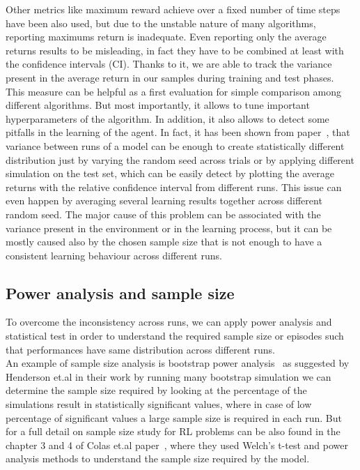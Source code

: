 \documentclass{article}
\begin{document}
Other metrics like maximum reward achieve over a fixed number of time steps have been also used, but  due to the unstable nature of many algorithms, reporting maximums return is inadequate. Even reporting only the average returns results to be misleading, in fact they have to be combined at least with the confidence intervals (CI). Thanks to it, we are able to track the variance present in the average return in our samples during training and test phases.\\ This measure can be helpful as a first evaluation for simple comparison among different algorithms. But most importantly, it allows to tune important hyperparameters of the algorithm. In addition, it also allows to detect some pitfalls in the learning of the agent. In fact, it has been shown from paper~\cite{DRL01}, that variance between runs of a model can be enough to create statistically different distribution just by varying the random seed across trials or by applying different simulation on the test set, which can be easily detect by plotting the average returns with the relative confidence interval from different runs.
This issue can even happen by averaging several learning results together across different random seed.
The major cause of this problem can be associated with the variance present in the environment or in the learning process, but it can be mostly caused also by the chosen sample size that is not enough to have a consistent learning behaviour across different runs.
\subsection{Power analysis and sample size}
To overcome the inconsistency across runs, we can apply power analysis and statistical test in order to understand the required sample size or episodes such that performances have same distribution across different runs.\\
An example of sample size analysis is bootstrap power analysis~\cite{pwranaly2} as suggested by Henderson et.al \cite{DRL01} in their work by running many bootstrap simulation we can determine the sample size required by looking at the percentage of the simulations result in statistically significant values, where in case of low percentage of significant values a large sample size is required in each run. But for a full detail on sample size study for RL problems can be also found in the chapter 3 and 4 of Colas et.al paper~\cite{PowerAnalysis}, where they used Welch's t-test and power analysis methods to understand the sample size required by the model.
\end{document}
